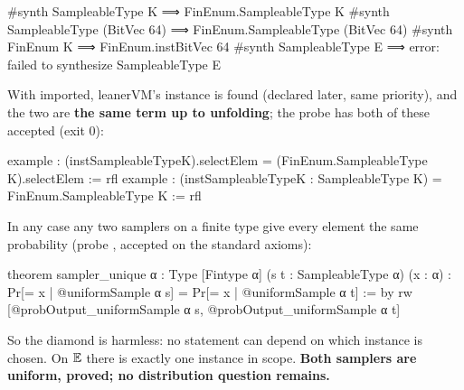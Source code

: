 \begin{leancode}
#synth SampleableType K        ⟹  FinEnum.SampleableType K
#synth SampleableType (BitVec 64)  ⟹  FinEnum.SampleableType (BitVec 64)
#synth FinEnum K               ⟹  FinEnum.instBitVec 64
#synth SampleableType E        ⟹  error: failed to synthesize SampleableType E
\end{leancode}


With  imported, leanerVM's instance is found (declared later, same
priority), and the two are \textbf{the same term up to unfolding}; the probe
 has both of these accepted (exit 0):

\begin{leancode}
example :
    (instSampleableTypeK).selectElem = (FinEnum.SampleableType K).selectElem := rfl
example : (instSampleableTypeK : SampleableType K) = FinEnum.SampleableType K := rfl
\end{leancode}


In any case any two samplers on a finite type give every element the same probability (probe
, accepted on the standard axioms):

\begin{leancode}
theorem sampler_unique {α : Type} [Fintype α] (s t : SampleableType α) (x : α) :
    Pr[= x | @uniformSample α s] = Pr[= x | @uniformSample α t] := by
  rw [@probOutput_uniformSample α s, @probOutput_uniformSample α t]
\end{leancode}


So the diamond is harmless: no statement can depend on which instance is chosen. On $\mathbb{E}$ there is
exactly one instance in scope. \textbf{Both samplers are uniform, proved; no distribution
question remains.}

